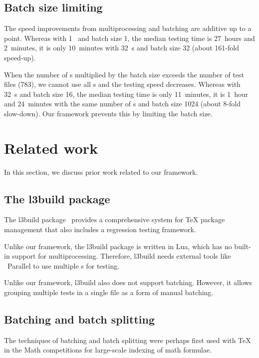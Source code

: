 \documentclass[final]{ltugboat}
\begin{document}
\subsection{Batch size limiting}
The speed improvements from multiprocessing and batching are additive up to a point. Whereas with 1~ and batch size 1, the median testing time is 27~hours and 2~minutes, it is only 10~minutes with 32~s and batch size 32 (about 161-fold speed-up).

When the number of s multiplied by the batch size exceeds the number of test files (783), we cannot use all s and the testing speed decreases. Whereas with 32~s and batch size 16, the median testing time is only 11~minutes, it is 1~hour and 24~minutes with the same number of s and batch size 1024 (about 8-fold slow-down). Our framework prevents this by limiting the batch size.

\section{Related work}
\label{sec:related-work}

In this section, we discuss prior work related to our framework.

\subsection{The l3build package}
The l3build package~\cite{mittelbach2014l3build, wright2015automating, wright2022l3build, latex2023l3build} provides a comprehensive system for \TeX{} package management that also includes a regression testing framework.

Unlike our framework, the l3build package is written in Lua, which has no built-in support for multiprocessing. Therefore, l3build needs external tools like ~Parallel to use multiple s for testing.

Unlike our framework, l3build also does not support batching. However, it allows grouping multiple tests in a single file as a form of manual batching.

\subsection{Batching and batch splitting}
The techniques of batching and batch splitting were perhaps first used with \TeX{} in the Math competitions for large-scale indexing of math formulae.
\end{document}
